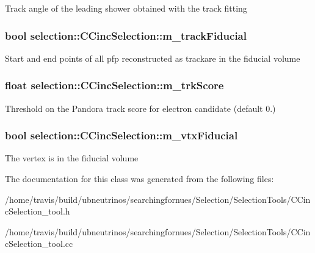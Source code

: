 Track angle of the leading shower obtained with the track fitting \hypertarget{classselection_1_1CCincSelection_a7f2d544a3260377cab6db80b8bf81302}{
\subsubsection[{m\-\_\-track\-Fiducial}]{\setlength{\rightskip}{0pt plus 5cm}bool selection\-::\-C\-Cinc\-Selection\-::m\-\_\-track\-Fiducial\hspace{0.3cm}{\ttfamily [private]}}}\label{classselection_1_1CCincSelection_a7f2d544a3260377cab6db80b8bf81302}
Start and end points of all pfp reconstructed as trackare in the fiducial volume \hypertarget{classselection_1_1CCincSelection_a2c3b80516e3731ec9b4f5ccbee6864ba}{
\subsubsection[{m\-\_\-trk\-Score}]{\setlength{\rightskip}{0pt plus 5cm}float selection\-::\-C\-Cinc\-Selection\-::m\-\_\-trk\-Score\hspace{0.3cm}{\ttfamily [private]}}}\label{classselection_1_1CCincSelection_a2c3b80516e3731ec9b4f5ccbee6864ba}
Threshold on the Pandora track score for electron candidate (default 0.) \hypertarget{classselection_1_1CCincSelection_a0f08b768b994a2b2798a54a1b11cfaef}{
\subsubsection[{m\-\_\-vtx\-Fiducial}]{\setlength{\rightskip}{0pt plus 5cm}bool selection\-::\-C\-Cinc\-Selection\-::m\-\_\-vtx\-Fiducial\hspace{0.3cm}{\ttfamily [private]}}}\label{classselection_1_1CCincSelection_a0f08b768b994a2b2798a54a1b11cfaef}
The vertex is in the fiducial volume 

The documentation for this class was generated from the following files\-:\begin{DoxyCompactItemize}
\item 
/home/travis/build/ubneutrinos/searchingfornues/\-Selection/\-Selection\-Tools/C\-Cinc\-Selection\-\_\-tool.\-h\item 
/home/travis/build/ubneutrinos/searchingfornues/\-Selection/\-Selection\-Tools/C\-Cinc\-Selection\-\_\-tool.\-cc\end{DoxyCompactItemize}
